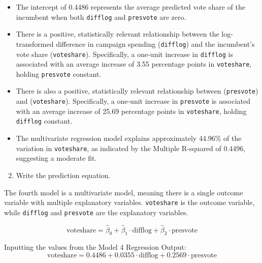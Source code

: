 \documentclass[12pt,letterpaper]{article}
\begin{document}
\vspace{0.5cm} \begin{itemize}[left=0pt, label=\textbullet]
	\item The intercept of 0.4486 represents the average predicted vote share of the incumbent when both \texttt{difflog} and \texttt{presvote} are zero.
	\item There is a positive, statistically relevant relationship between the log-transformed difference in campaign spending (\texttt{difflog}) and the incumbent’s vote share (\texttt{voteshare}). Specifically, a one-unit increase in \texttt{difflog} is associated with an average increase of 3.55 percentage points in \texttt{voteshare}, holding \texttt{presvote} constant.
	\item There is also a positive, statistically relevant relationship between (\texttt{presvote}) and (\texttt{voteshare}). Specifically, a one-unit increase in \texttt{presvote} is associated with an average increase of 25.69 percentage points in \texttt{voteshare}, holding \texttt{difflog} constant.
	\item The multivariate regression model explains approximately 44.96\% of the variation in \texttt{voteshare}, as indicated by the Multiple R-squared of 0.4496, suggesting a moderate fit.
\end{itemize}


\noindent\begin{enumerate}[left=0pt]
\setcounter{enumi}{1}	
\item Write the prediction equation.
\end{enumerate}

\vspace{0.25cm}
\noindent The fourth model is a multivariate model, meaning there is a single outcome variable with multiple explanatory variables. \texttt{voteshare} is the outcome variable, while \texttt{difflog} and \texttt{presvote} are the explanatory variables.

\begin{equation}
	\text{voteshare} = \hat{\beta}_0 + \hat{\beta}_1 \cdot \text{difflog} + \hat{\beta}_2 \cdot \text{presvote}
\end{equation}

\vspace{0.5cm} \noindent Inputting the values from the Model 4 Regression Output:
\begin{equation}
	\text{voteshare} = 0.4486 + 0.0355 \cdot \text{difflog} + 0.2569 \cdot \text{presvote}
\end{equation}
\end{document}
